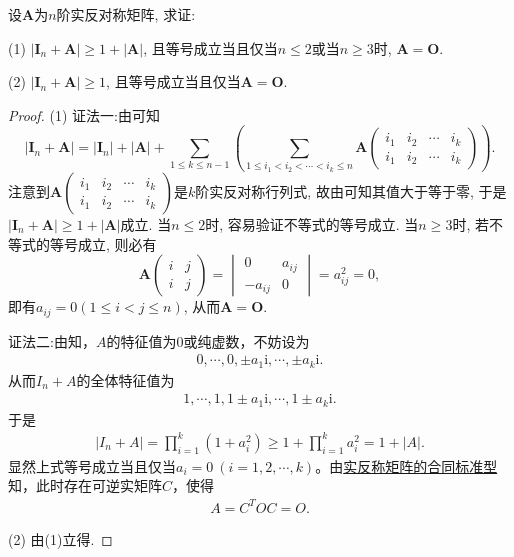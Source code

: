 \documentclass[../../main.tex]{subfiles}%
\begin{document}
\begin{proposition}\label{proposition:反称矩阵A的I_n+A的行列式相关结论}
设$\boldsymbol{A}$为$n$阶实反对称矩阵, 求证:

(1) $|\boldsymbol{I}_n+\boldsymbol{A}|\geqslant  1 + |\boldsymbol{A}|$, 且等号成立当且仅当$n\leqslant  2$或当$n\geqslant  3$时, $\boldsymbol{A}=\boldsymbol{O}$.

(2) $|\boldsymbol{I}_n+\boldsymbol{A}|\geqslant  1$, 且等号成立当且仅当$\boldsymbol{A}=\boldsymbol{O}$.
\end{proposition}
\begin{proof}
(1) {\color{blue}证法一:}由可知
\[
|\boldsymbol{I}_n+\boldsymbol{A}| = |\boldsymbol{I}_n|+|\boldsymbol{A}|+\sum_{1\leqslant  k\leqslant  n - 1}\left(\sum_{1\leqslant  i_1 < i_2 < \cdots < i_k\leqslant  n} \boldsymbol{A}\begin{pmatrix}
i_1 & i_2 & \cdots & i_k \\
i_1 & i_2 & \cdots & i_k
\end{pmatrix}\right).
\]
注意到$\boldsymbol{A}\begin{pmatrix}
i_1 & i_2 & \cdots & i_k \\
i_1 & i_2 & \cdots & i_k
\end{pmatrix}$是$k$阶实反对称行列式, 故由可知其值大于等于零, 于是$|\boldsymbol{I}_n+\boldsymbol{A}|\geqslant  1 + |\boldsymbol{A}|$成立. 当$n\leqslant  2$时, 容易验证不等式的等号成立. 当$n\geqslant  3$时, 若不等式的等号成立, 则必有
\[
\boldsymbol{A}\begin{pmatrix}
i & j \\
i & j
\end{pmatrix}=\begin{vmatrix}
0 & a_{ij} \\
-a_{ij} & 0
\end{vmatrix}=a_{ij}^2 = 0,
\]
即有$a_{ij} = 0 (1\leqslant  i < j\leqslant  n)$, 从而$\boldsymbol{A}=\boldsymbol{O}$.

{\color{blue}证法二:}由知，$A$的特征值为$0$或纯虚数，不妨设为
\begin{align*}
0, \cdots, 0, \pm a_1\mathrm{i}, \cdots, \pm a_k\mathrm{i}.
\end{align*}
从而$I_n + A$的全体特征值为
\begin{align*}
1, \cdots, 1, 1 \pm a_1\mathrm{i}, \cdots, 1 \pm a_k\mathrm{i}.
\end{align*}
于是
\begin{align*}
|I_n + A| = \prod_{i=1}^k (1 + a_i^2) \geqslant 1 + \prod_{i=1}^k a_i^2 = 1 + |A|.
\end{align*}
显然上式等号成立当且仅当$a_i = 0\ (i = 1,2,\cdots,k)$。由\hyperref[theorem:反对称矩阵的合同标准型]{实反称矩阵的合同标准型}知，此时存在可逆实矩阵$C$，使得
\begin{align*}
A = C^T O C = O.
\end{align*}

(2) 由(1)立得.
\end{proof}
\end{document}
